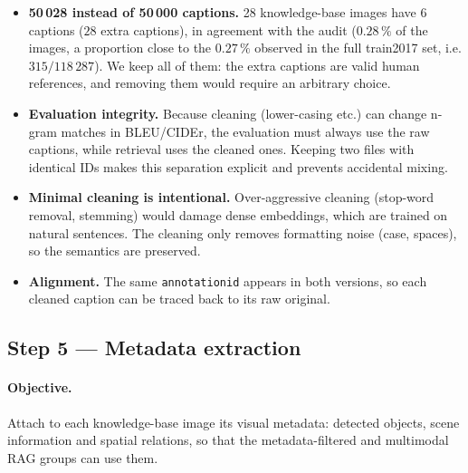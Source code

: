 \documentclass[11pt,a4paper]{article}
\renewcommand{\_}{\textunderscore\allowbreak{}}
\newcommand{\code}[1]{\texttt{#1}}
\begin{document}
\begin{interp}
\begin{itemize}[nosep]
  \item \textbf{50\,028 instead of 50\,000 captions.} 28 knowledge-base images have 6 captions ($28$ extra captions), in agreement with the audit ($0.28\,\%$ of the images, a proportion close to the $0.27\,\%$ observed in the full train2017 set, i.e. $315/118\,287$). We keep all of them: the extra captions are valid human references, and removing them would require an arbitrary choice.
  \item \textbf{Evaluation integrity.} Because cleaning (lower-casing etc.) can change n-gram matches in BLEU/CIDEr, the evaluation must always use the raw captions, while retrieval uses the cleaned ones. Keeping two files with identical IDs makes this separation explicit and prevents accidental mixing.
  \item \textbf{Minimal cleaning is intentional.} Over-aggressive cleaning (stop-word removal, stemming) would damage dense embeddings, which are trained on natural sentences. The cleaning only removes formatting noise (case, spaces), so the semantics are preserved.
  \item \textbf{Alignment.} The same \code{annotation\_id} appears in both versions, so each cleaned caption can be traced back to its raw original.
\end{itemize}
\end{interp}

\subsection{Step 5 --- Metadata extraction}
\label{sec:metadata}

\paragraph{Objective.} Attach to each knowledge-base image its visual metadata: detected objects, scene information and spatial relations, so that the metadata-filtered and multimodal RAG groups can use them.
\end{document}
